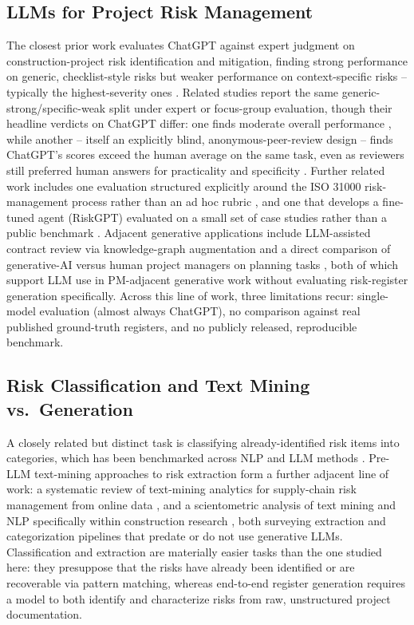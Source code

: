 \documentclass[conference]{IEEEtran}
\begin{document}
\subsection{LLMs for Project Risk Management}
The closest prior work evaluates ChatGPT against expert judgment on
construction-project risk identification and mitigation, finding strong
performance on generic, checklist-style risks but weaker performance on
context-specific risks -- typically the highest-severity ones
\cite{asce2025exploring_chatgpt_risk}. Related studies report the same
generic-strong/specific-weak split under expert or focus-group evaluation,
though their headline verdicts on ChatGPT differ: one finds moderate
overall performance \cite{aladag2023assessing_chatgpt}, while another --
itself an explicitly blind, anonymous-peer-review design -- finds
ChatGPT's scores exceed the human average on the same task, even as
reviewers still preferred human answers for practicality and specificity
\cite{ecam2024chatgpt_exceed_humans}. Further related work includes
one evaluation structured explicitly around the ISO 31000 risk-management
process rather than an ad hoc rubric \cite{esrel2023iso31000_chatgpt}, and
one that develops a fine-tuned agent (RiskGPT) evaluated on a small set of
case studies rather than a public benchmark \cite{wen2025riskgpt}. Adjacent
generative applications include LLM-assisted contract review via
knowledge-graph augmentation \cite{contractkg2023llm} and a direct
comparison of generative-AI versus human project managers on planning
tasks \cite{barcaui2023whoisbetter}, both of which support LLM use in
PM-adjacent generative work without evaluating risk-register generation
specifically. Across this line of work, three limitations recur:
single-model evaluation (almost always ChatGPT), no comparison against real
published ground-truth registers, and no publicly released, reproducible
benchmark.

\subsection{Risk Classification and Text Mining vs.\ Generation}
A closely related but distinct task is classifying already-identified risk
items into categories, which has been benchmarked across NLP and LLM
methods \cite{buildings2025risk_classification}. Pre-LLM text-mining
approaches to risk extraction form a further adjacent line of work: a
systematic review of text-mining analytics for supply-chain risk management
from online data \cite{textmining2025scrm}, and a scientometric analysis of
text mining and NLP specifically within construction research
\cite{textmining2026construction_scientometric}, both surveying extraction
and categorization pipelines that predate or do not use generative LLMs.
Classification and extraction are materially easier tasks than the one
studied here: they presuppose that the risks have already been identified
or are recoverable via pattern matching, whereas end-to-end register
generation requires a model to both identify and characterize risks from
raw, unstructured project documentation.
\end{document}
